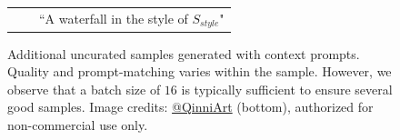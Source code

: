 \begin{figure}[!hbt]
{\begin{tabular}{c@{\hskip 5pt} c@{\hskip 5pt} c}
         & & {``A waterfall in the style of {\color[HTML]{EF5675}$S_{style}$}"} \\
        
        

    \end{tabular}}
    \caption{Additional uncurated samples generated with context prompts. Quality and prompt-matching varies within the sample. However, we observe that a batch size of $16$ is typically sufficient to ensure several good samples. Image credits: \href{https://www.deviantart.com/qinni}{@QinniArt} (bottom), authorized for non-commercial use only.}
    \label{fig:uncurated_prompt_2} 
\end{figure}